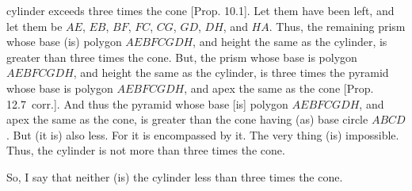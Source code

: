 \begin{Parallel}{}{}
{cylinder exceeds three times the cone [Prop. 10.1]. Let them have been left, and let them be $AE$, $EB$, $BF$, $FC$, $CG$,
$GD$, $DH$, and $HA$. Thus, the remaining prism whose base (is) polygon $AEBFCGDH$, and height  the
same as the cylinder, is greater than three times the cone. But, the prism whose base is polygon $AEBFCGDH$,
and height the same as the cylinder,  is three times the pyramid whose base is polygon $AEBFCGDH$, and
apex the same as the cone [Prop. 12.7~corr.]. And thus the pyramid whose base [is] polygon 
$AEBFCGDH$, and apex the same as the cone, is greater than the cone having (as) base circle $ABCD$. But (it is)
also less. For it is encompassed by it. The very thing (is) impossible. Thus, the cylinder is not more than
three times the cone.

So, I say that neither (is) the cylinder less than three times the cone.

}
\end{Parallel}
